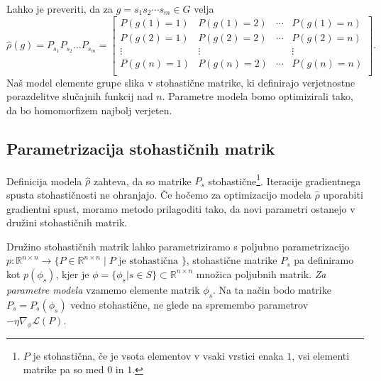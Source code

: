 \documentclass[mat2, tisk]{fmfdelo}
\newcommand{\R}{\mathbb R}
\newcommand{\loss }{\mathcal L}
\begin{document}
              Lahko je preveriti, da za  $g = s_1 s_2 \dotsm s_m\in G$ velja $$
              \hat \rho (g) = P_{s_1} P_{s_2} \dotsc P_{s_m} =
              \begin{bmatrix}
                P(g(1) = 1) & P(g(1) = 2) & \dotsm & P(g(1) = n) \\
                P(g(2) = 1) & P(g(2) = 2) & \dotsm & P(g(2) = n) \\
                \vdots & \vdots & & \vdots \\
                P(g(n) = 1) & P(g(n) = 2) & \dotsm & P(g(n) = n) \\
              \end{bmatrix}.
              $$
              Naš model elemente grupe slika v stohastične matrike,
              ki definirajo verjetnostne porazdelitve slučajnih
              funkcij nad $n$. Parametre modela bomo optimizirali
              tako, da bo homomorfizem najbolj verjeten.
              \subsection{Parametrizacija stohastičnih matrik}
              \label{section:parametrizacija stohastičnih matrik}
              Definicija modela $\hat  \rho$ zahteva, da so matrike
              $P_s$ stohastične\footnote{$P$ je stohastična, če je
                vsota elementov v vsaki vrstici enaka $1$, vsi elementi
              matrike pa so med $0$ in $1$.}. Iteracije gradientnega
              spusta stohastičnosti ne ohranjajo. Če hočemo za
              optimizacijo modela $\hat \rho$ uporabiti gradientni
              spust, moramo metodo prilagoditi tako, da novi
              parametri ostanejo v družini stohastičnih matrik.

              Družino stohastičnih matrik lahko parametriziramo s
              poljubno parametrizacijo $p \colon \R^{n \times n} \to
              \{P \in \R^{n \times n} \mid P \text{ je stohastična
              }\}$, stohastične matrike $P_s$ pa definiramo kot
              $p(\phi_s)$, kjer je $\phi = \{\phi_s | s\in S \}
              \subset \R^{n \times n}$ množica poljubnih matrik.
              \emph{Za parametre modela} vzamemo elemente matrik
              $\phi_s$. Na ta način bodo matrike $P_s = P_s(\phi_s)$
              vedno stohastične, ne glede na spremembo parametrov
              $-\eta \nabla_\phi \loss(P)$.
\end{document}
